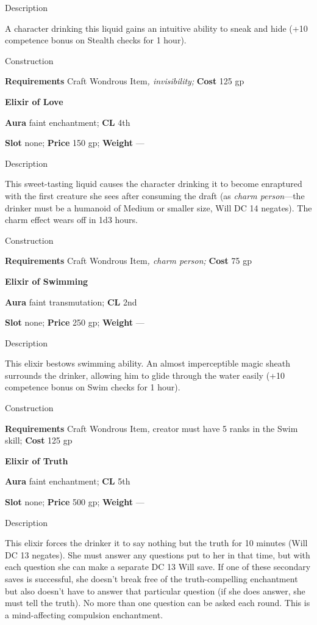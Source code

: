 Description
				
A character drinking this liquid gains an intuitive ability to sneak and hide (+10 competence bonus on Stealth checks for 1 hour). 
				
Construction
				
\textbf{Requirements} Craft Wondrous Item\textit{, invisibility;}\textbf{ Cost }125 gp
				
\textbf{Elixir of Love}
				
\textbf{Aura} faint enchantment;\textbf{ CL }4th
				
\textbf{Slot} none; \textbf{Price} 150 gp; \textbf{Weight }---
				
Description
				
This sweet-tasting liquid causes the character drinking it to become enraptured with the first creature she sees after consuming the draft (as \textit{charm person}---the drinker must be a humanoid of Medium or smaller size, Will DC 14 negates). The charm effect wears off in 1d3 hours. 
				
Construction
				
\textbf{Requirements} Craft Wondrous Item\textit{, charm person;}\textbf{ Cost }75 gp
				
\textbf{Elixir of Swimming}
				
\textbf{Aura} faint transmutation;\textbf{ CL }2nd
				
\textbf{Slot} none; \textbf{Price} 250 gp; \textbf{Weight }---
				
Description
				
This elixir bestows swimming ability. An almost imperceptible magic sheath surrounds the drinker, allowing him to glide through the water easily (+10 competence bonus on Swim checks for 1 hour). 
				
Construction
				
\textbf{Requirements} Craft Wondrous Item\textit{, }creator must have 5 ranks in the Swim skill;\textbf{ Cost }125 gp
				
\textbf{Elixir of Truth}
				
\textbf{Aura} faint enchantment;\textbf{ CL }5th
				
\textbf{Slot} none; \textbf{Price} 500 gp; \textbf{Weight }---
				
Description
				
This elixir forces the drinker it to say nothing but the truth for 10 minutes (Will DC 13 negates). She must answer any questions put to her in that time, but with each question she can make a separate DC 13 Will save. If one of these secondary saves is successful, she doesn't break free of the truth-compelling enchantment but also doesn't have to answer that particular question (if she does answer, she must tell the truth). No more than one question can be asked each round. This is a mind-affecting compulsion enchantment. 
				
